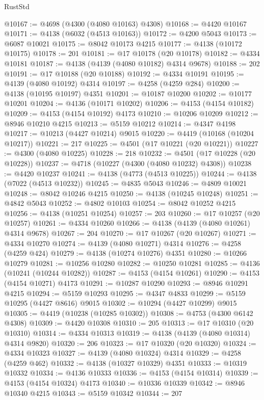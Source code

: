 \begin{lexlean}{RustStd}
\begin{coremodule}
@10167 := @4698 (@4300 (@4080 @10163) @4308)
@10168 := @4420 @10167
@10171 := @4138 (@6032 (@4513 @10163))
@10172 := @4200 @5043
@10173 := @6087 @10021
@10175 := @8042 @10173 @4215
@10177 := @4138 (@10172 @10175)
@10178 := 201
@10181 := @17 @10178 (@20 @10178)
@10182 := @4334 @10181
@10187 := @4138 (@4139 (@4080 @10182) @4314 @9678)
@10188 := 202
@10191 := @17 @10188 (@20 @10188)
@10192 := @4334 @10191
@10195 := @4139 (@4080 @10192) @4314
@10197 := @4258 (@4259 @284)
@10200 := @4138 (@10195 @10197) @4351
@10201 := @10187 @10200
@10202 := @10177 @10201
@10204 := @4136 (@10171 @10202)
@10206 := @4153 (@4154 @10182)
@10209 := @4153 (@4154 @10192) @4173
@10210 := @10206 @10209
@10212 := @8946 @10210 @4215
@10213 := @5159 @10212
@10214 := @4347 @4198
@10217 := @10213 (@4427 @10214) @9015
@10220 := @4419 (@10168 (@10204 @10217))
@10221 := 217
@10225 := @4501 (@17 @10221 (@20 @10221))
@10227 := @4300 (@4080 @10225)
@10228 := 218
@10232 := @4501 (@17 @10228 (@20 @10228))
@10237 := @4718 (@10227 (@4300 (@4080 @10232) @4308))
@10238 := @4420 @10237
@10241 := @4138 (@4773 (@4513 @10225))
@10244 := @4138 (@7022 (@4513 @10232))
@10245 := @4835 @5043
@10246 := @4809 @10021
@10248 := @8042 @10246 @4215
@10250 := @4138 (@10245 @10248)
@10251 := @4842 @5043
@10252 := @4802 @10103
@10254 := @8042 @10252 @4215
@10256 := @4138 (@10251 @10254)
@10257 := 203
@10260 := @17 @10257 (@20 @10257)
@10261 := @4334 @10260
@10266 := @4138 (@4139 (@4080 @10261) @4314 @9678)
@10267 := 204
@10270 := @17 @10267 (@20 @10267)
@10271 := @4334 @10270
@10274 := @4139 (@4080 @10271) @4314
@10276 := @4258 (@4259 @424)
@10279 := @4138 (@10274 @10276) @4351
@10280 := @10266 @10279
@10281 := @10256 @10280
@10282 := @10250 @10281
@10285 := @4136 (@10241 (@10244 @10282))
@10287 := @4153 (@4154 @10261)
@10290 := @4153 (@4154 @10271) @4173
@10291 := @10287 @10290
@10293 := @8946 @10291 @4215
@10294 := @5159 @10293
@10295 := @4347 @4833
@10299 := @5159 @10295 (@4427 @8616) @9015
@10302 := @10294 (@4427 @10299) @9015
@10305 := @4419 (@10238 (@10285 @10302))
@10308 := @4753 (@4300 @6142 @4308)
@10309 := @4420 @10308
@10310 := 205
@10313 := @17 @10310 (@20 @10310)
@10314 := @4334 @10313
@10319 := @4138 (@4139 (@4080 @10314) @4314 @9820)
@10320 := 206
@10323 := @17 @10320 (@20 @10320)
@10324 := @4334 @10323
@10327 := @4139 (@4080 @10324) @4314
@10329 := @4258 (@4259 @462)
@10332 := @4138 (@10327 @10329) @4351
@10333 := @10319 @10332
@10334 := @4136 @10333
@10336 := @4153 (@4154 @10314)
@10339 := @4153 (@4154 @10324) @4173
@10340 := @10336 @10339
@10342 := @8946 @10340 @4215
@10343 := @5159 @10342
@10344 := 207

\end{coremodule}
\end{lexlean}
